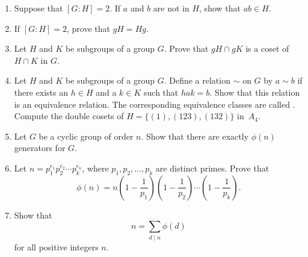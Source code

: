 {\begin{enumerate}
\item
Suppose that $[G : H] = 2$. If $a$ and $b$ are not in $H$, show that $ab \in H$.

\item
If $[G : H] = 2$, prove that $gH = Hg$.

\item
Let $H$ and $K$ be subgroups of a group $G$.  Prove that $gH \cap gK$ is a coset of $H \cap K$ in $G$.  
 
\item
Let $H$ and $K$ be subgroups of a group $G$.  Define a relation $\sim$ on $G$ by $a \sim b$ if there exists an $h \in H$ and a $k \in K$ such that $hak = b$.  Show that this relation is an equivalence relation.  The corresponding equivalence classes are called .  Compute the double cosets of $H = \{ (1),(123), (132) \}$ in~$A_4$. 
 
%

 
\item
Let $G$ be a cyclic group of order $n$.  Show that there are exactly $\phi(n)$ generators for $G$.

\item
Let $n = p_1^{e_1} p_2^{e_2} \cdots p_k^{e_k}$, where $p_1, p_2, \ldots, p_k$ are distinct primes.  Prove that
\[
\phi(n) =  n 
\left( 1- \frac{1}{p_1} \right)
\left( 1- \frac{1}{p_2} \right)	\cdots
\left( 1- \frac{1}{p_k} \right).
\]


\item
Show that 
\[
n = \sum_{d \mid n} \phi(d)
\]
for all positive integers $n$.

\end{enumerate}
}

\sagesection


